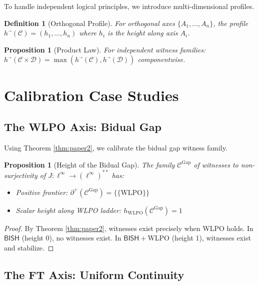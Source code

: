 \documentclass[11pt]{article}
\newtheorem{definition}[theorem]{Definition}
\newtheorem{proposition}[theorem]{Proposition}
\newcommand{\WLPO}{\mathrm{WLPO}}
\newcommand{\BISH}{\mathsf{BISH}}
\newcommand{\linf}{\ell^\infty}
\newcommand{\Frontierpos}{\partial^{+}}
\begin{document}
To handle independent logical principles, we introduce multi-dimensional profiles.

\begin{definition}[Orthogonal Profile]
For orthogonal axes $\{A_1, \ldots, A_n\}$, the \emph{profile} $h^{\vec{}}(\mathcal{C}) = (h_1, \ldots, h_n)$ where $h_i$ is the height along axis $A_i$.
\end{definition}

\begin{proposition}[Product Law]
For independent witness families: $h^{\vec{}}(\mathcal{C} \times \mathcal{D}) = \max(h^{\vec{}}(\mathcal{C}), h^{\vec{}}(\mathcal{D}))$ componentwise.
\end{proposition}

\section{Calibration Case Studies}

\subsection{The WLPO Axis: Bidual Gap}

Using Theorem \ref{thm:paper2}, we calibrate the bidual gap witness family.

\begin{proposition}[Height of the Bidual Gap]
The family $\mathcal{C}^{\text{Gap}}$ of witnesses to non-surjectivity of $J: \linf \to (\linf)^{**}$ has:
\begin{itemize}
\item Positive frontier: $\Frontierpos(\mathcal{C}^{\text{Gap}}) = \{\{\WLPO\}\}$
\item Scalar height along WLPO ladder: $h_{\WLPO}(\mathcal{C}^{\text{Gap}}) = 1$
\end{itemize}
\end{proposition}

\begin{proof}
By Theorem \ref{thm:paper2}, witnesses exist precisely when WLPO holds. In $\BISH$ (height 0), no witnesses exist. In $\BISH + \WLPO$ (height 1), witnesses exist and stabilize.
\end{proof}

\subsection{The FT Axis: Uniform Continuity}
\end{document}
